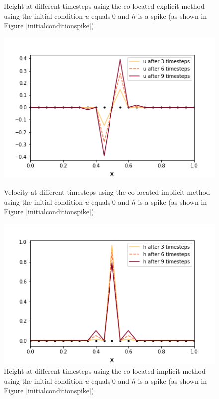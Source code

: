 \documentclass[a4paper,12pt, notitlepage]{article}
\begin{document}
\begin{figure} [H]
\begin{minipage}{.5\textwidth}
		\caption{\label{height_colocated_explicit_spike} Height at different timesteps using the co-located explicit method using the initial condition $u$ equals 0 and $h$ is a spike (as shown in Figure \ref{initialconditionspike}).} 
	\end{minipage}
\end{figure}

\begin{figure} [H]
	\begin{minipage}{.5\textwidth}
		\ContinuedFloat*
		\captionsetup{width=0.9\textwidth}
		\captionsetup{justification=centering}
		\includegraphics[width=\textwidth]{velocity_colocated_implicit_spike.png}
		\caption{\label{velocity_colocated_implicit_spike} Velocity at different timesteps using the co-located implicit method using the initial condition $u$ equals 0 and $h$ is a spike (as shown in Figure \ref{initialconditionspike}).} 
	\end{minipage}
	\begin{minipage}{.5\textwidth}
		\ContinuedFloat
		\captionsetup{width=0.9\textwidth}
		\captionsetup{justification=centering}
		\includegraphics[width=\textwidth]{height_colocated_implicit_spike.png}
		\caption{\label{height_colocated_implicit_spike} Height at different timesteps using the co-located implicit method using the initial condition $u$ equals 0 and $h$ is a spike (as shown in Figure \ref{initialconditionspike}).} 
	\end{minipage}
\end{figure}
\end{document}
